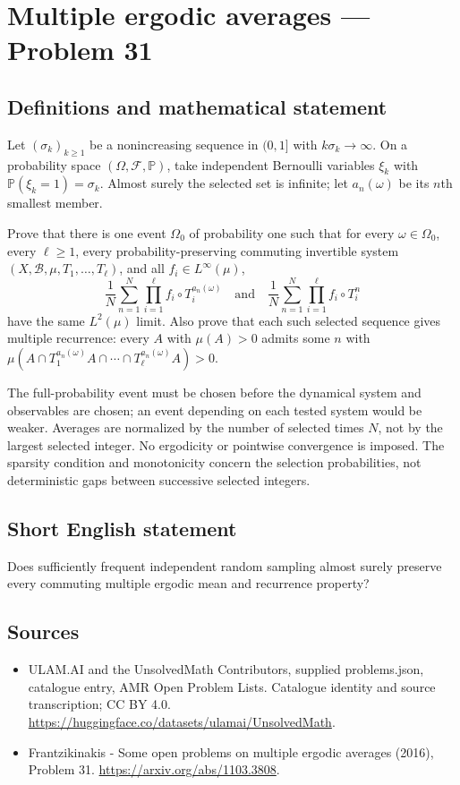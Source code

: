 \documentclass[11pt,a4paper]{article}
\begin{document}
\section*{Multiple ergodic averages — Problem 31}\label{statement}

\subsection{Definitions and mathematical statement}
Let $(\sigma_k)_{k\ge1}$ be a nonincreasing
sequence in $(0,1]$ with $k\sigma_k\to\infty$.
On a probability space $(\Omega,\mathcal F,\mathbb P)$,
take independent Bernoulli variables $\xi_k$
with $\mathbb P(\xi_k=1)=\sigma_k$.
Almost surely the selected set is infinite;
let $a_n(\omega)$ be its $n$th smallest member.

Prove that there is one event $\Omega_0$ of
probability one such that for every
$\omega\in\Omega_0$, every $\ell\ge1$, every
probability-preserving commuting invertible system
$(X,\mathcal B,\mu,T_1,\ldots,T_\ell)$, and all
$f_i\in L^\infty(\mu)$,
\[
 \frac1N\sum_{n=1}^N\prod_{i=1}^\ell f_i\circ T_i^{a_n(\omega)}
 \quad\text{and}\quad
 \frac1N\sum_{n=1}^N\prod_{i=1}^\ell f_i\circ T_i^n
\]
have the same $L^2(\mu)$ limit. Also prove
that each such selected sequence gives multiple
recurrence: every $A$ with $\mu(A)>0$ admits
some $n$ with
$\mu(A\cap T_1^{a_n(\omega)}A\cap\cdots
\cap T_\ell^{a_n(\omega)}A)>0$.

The full-probability event must be chosen before
the dynamical system and observables are chosen;
an event depending on each tested system would
be weaker. Averages are normalized by the
number of selected times $N$, not by the
largest selected integer. No ergodicity or
pointwise convergence is imposed. The sparsity
condition and monotonicity concern the selection
probabilities, not deterministic gaps between
successive selected integers.
\subsection{Short English statement}
Does sufficiently frequent independent random sampling almost surely preserve every commuting multiple ergodic mean and recurrence property?
\subsection{Sources}
\begin{itemize}
\item[S1] ULAM.AI and the UnsolvedMath Contributors, supplied problems.json, catalogue entry, AMR Open Problem Lists. Catalogue identity and source transcription; CC BY 4.0.
\url{https://huggingface.co/datasets/ulamai/UnsolvedMath}.
\item[S2] Frantzikinakis - Some open problems on multiple ergodic averages (2016), Problem 31. 
\url{https://arxiv.org/abs/1103.3808}.
\end{itemize}
\end{document}
